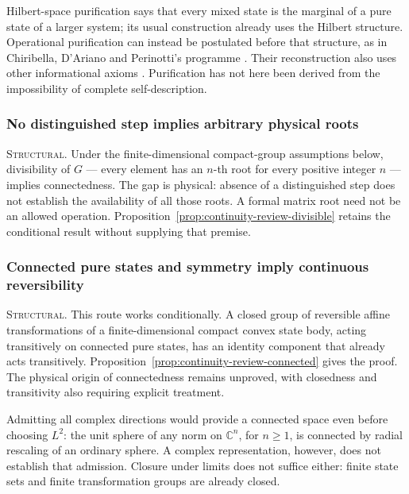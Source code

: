 Hilbert-space purification says that every mixed state is the marginal of a
pure state of a larger system; its usual construction already uses the
Hilbert structure. Operational purification can instead be postulated before
that structure, as in Chiribella, D'Ariano and Perinotti's programme
\autocite{chiribella2010purification}. Their reconstruction also uses other
informational axioms \autocite{chiribella2011informational}. Purification has
not here been derived from the impossibility of complete self-description.

\subsubsection{No distinguished step implies arbitrary physical roots}
\label{app:continuity-roots}

\noindent\textsc{Structural.}
Under the finite-dimensional compact-group assumptions below, divisibility
of $G$ --- every element has an $n$-th root for every positive integer $n$ ---
implies connectedness. The gap is physical: absence of a distinguished step
does not establish the availability of all those roots. A formal matrix
root need not be an allowed operation. Proposition~\ref{prop:continuity-review-divisible}
retains the conditional result without supplying that premise.

\subsubsection{Connected pure states and symmetry imply continuous reversibility}
\label{app:continuity-connected}

\noindent\textsc{Structural.}
This route works conditionally. A closed group of reversible affine
transformations of a finite-dimensional compact convex state body, acting
transitively on connected pure states, has an identity component that
already acts transitively. Proposition~\ref{prop:continuity-review-connected}
gives the proof. The physical origin of connectedness remains unproved,
with closedness and transitivity also requiring explicit treatment.

Admitting all complex directions would provide a connected space even
before choosing $L^2$: the unit sphere of any norm on $\mathbb C^n$, for
$n\geq1$, is connected by radial rescaling of an ordinary sphere. A complex
representation, however, does not establish that admission. Closure under
limits does not suffice either: finite state sets and finite transformation
groups are already closed.

